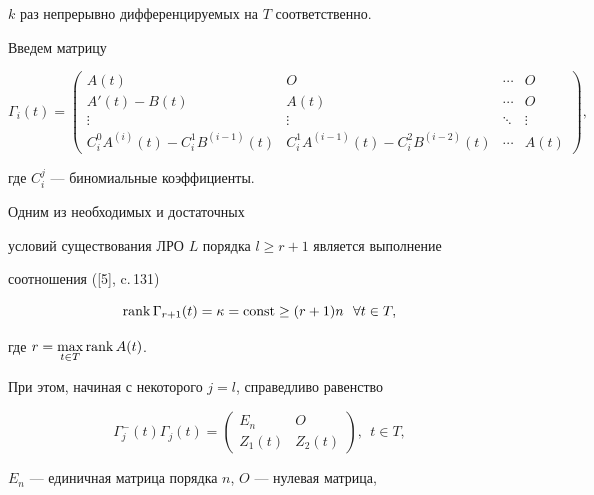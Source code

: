 $k$ раз непрерывно дифференцируемых на $T$ соответственно.





Введем матрицу


$$


\Gamma_i(t)=


\begin{pmatrix}


A(t) & O & \dotsb & O\\


A'(t)-B(t) & A(t) & \dotsb & O\\


\vdots & \vdots & \ddots & \vdots\\


C^0_i A^{(i)}(t)-C^1_i B^{(i-1)}(t) &


C^1_i A^{(i-1)}(t)-C^2_i B^{(i-2)}(t) & \dotsb & A(t)


\end{pmatrix}


,


$$


где $C^j_i$ --- биномиальные коэффициенты.





Одним из необходимых и достаточных


условий существования ЛРО $L$ порядка $l\ge r+1$ является выполнение


соотношения ([5], c.\,131)


$$


\rank\Gamma_{r+1}(t)=\kappa=\const


\geq (r+1)n \ \ \forall t \in T,


$$


где $r=\max\limits_{t\in T}\operatorname{rank} A(t)$.


При этом, начиная с некоторого $j =l$, справедливо равенство


$$


\Gamma^-_j(t) \Gamma_j(t)=


\begin{pmatrix}


E_n & O\\


Z_1(t) & Z_2(t)


\end{pmatrix}


,\ \ t \in T,


$$


$E_n$ --- единичная матрица порядка $n$, $O$ --- нулевая матрица,



